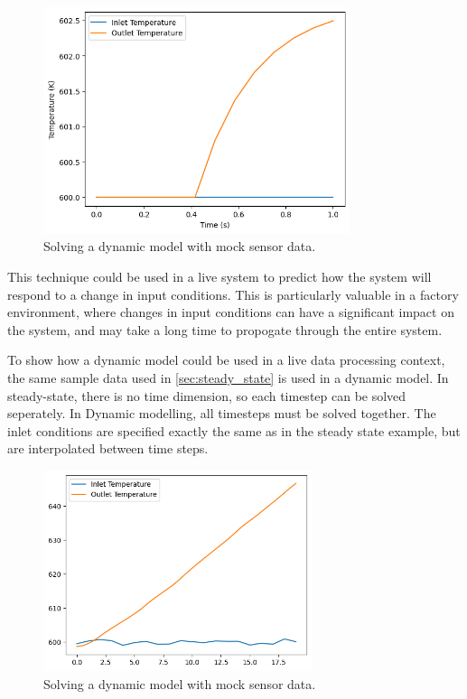 \documentclass[12pt]{article}
\begin{document}
\begin{figure}
    \centering
    \includegraphics[width=0.8\textwidth]{dynamic_test.png}
    \caption{Solving a dynamic model with mock sensor data.}
    \label{fig:dynamic_test}
\end{figure}

This technique could be used in a live system to predict how the system will respond to a change in input conditions. This is particularly valuable in a factory environment, where changes in input conditions can have a significant impact on the system, and may take a long time to propogate through the entire system. \cite{CITATION_NEEDED}

To show how a dynamic model could be used in a live data processing context, the same sample data used in \cref{sec:steady_state} is used in a dynamic model. In steady-state, there is no time dimension, so each timestep can be solved seperately. In Dynamic modelling, all timesteps must be solved together. The inlet conditions are specified exactly the same as in the steady state example, but are interpolated between time steps. 

\begin{figure}
    \centering
    \includegraphics[width=0.7\textwidth]{dynamic_live.png}
    \caption{Solving a dynamic model with mock sensor data.}
    \label{fig:dynamic_live}
\end{figure}
\end{document}
